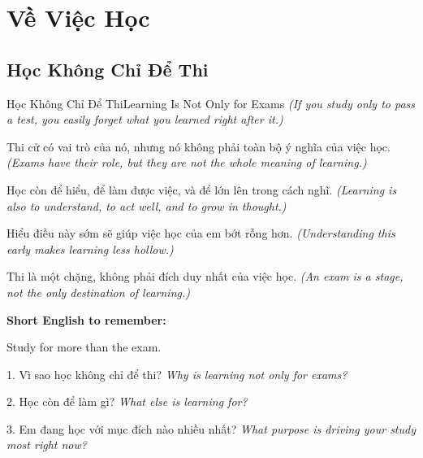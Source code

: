 \chapter{Về Việc Học}

\section{Học Không Chỉ Để Thi}
\begin{truyen}{Học Không Chỉ Để Thi}{Learning Is Not Only for Exams}
\textit{(If you study only to pass a test, you easily forget what you learned right after it.)}

Thi cử có vai trò của nó, nhưng nó không phải toàn bộ ý nghĩa của việc học.
\textit{(Exams have their role, but they are not the whole meaning of learning.)}

Học còn để hiểu, để làm được việc, và để lớn lên trong cách nghĩ.
\textit{(Learning is also to understand, to act well, and to grow in thought.)}

Hiểu điều này sớm sẽ giúp việc học của em bớt rỗng hơn.
\textit{(Understanding this early makes learning less hollow.)}
\end{truyen}

\begin{baihoc}
Thi là một chặng, không phải đích duy nhất của việc học.
\textit{(An exam is a stage, not the only destination of learning.)}
\end{baihoc}

\begin{ghinhoanh}
\textbf{Short English to remember:}

Study for more than the exam.

\end{ghinhoanh}

\begin{tuhocnhanh}
1. Vì sao học không chỉ để thi? \textit{Why is learning not only for exams?}

2. Học còn để làm gì? \textit{What else is learning for?}

3. Em đang học với mục đích nào nhiều nhất? \textit{What purpose is driving your study most right now?}
\end{tuhocnhanh}
\ngancach

